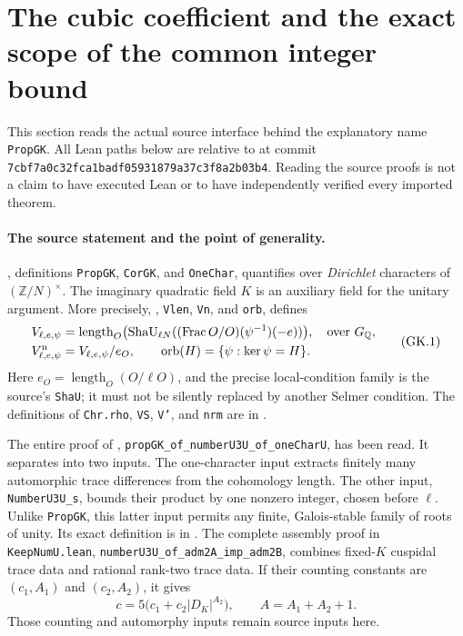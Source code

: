 \section{The cubic coefficient and the exact scope of the common integer bound}
\label{sec:cubic-propgk-size}

This section reads the actual source interface behind the explanatory
name \texttt{PropGK}.  All Lean paths below are relative to
at commit \texttt{7cbf7a0c32fca1badf05931879a37c3f8a2b03b4}.
Reading the source proofs is not a claim to have executed Lean or to
have independently verified every imported theorem.

\paragraph{The source statement and the point of generality.}
, definitions
\texttt{PropGK}, \texttt{CorGK}, and \texttt{OneChar}, quantifies
over \emph{Dirichlet} characters of $(\mathbb Z/N)^\times$.
The imaginary quadratic field $K$ is an auxiliary field for the
unitary argument.  More precisely,
,
\texttt{Vlen}, \texttt{Vn}, and \texttt{orb}, defines
\[
 \begin{split}
 V_{\ell,e,\psi}
   &=\operatorname{length}_{O}
       \bigl(\operatorname{ShaU}_{\ell N}
        ((\operatorname{Frac}O/O)(\psi^{-1})(-e))\bigr),
       \quad\hbox{over }G_{\mathbb Q},\\
 V^{\rm n}_{\ell,e,\psi}&=V_{\ell,e,\psi}/e_O,
 \qquad
 \operatorname{orb}(H)=\{\psi:\ker\psi=H\}.
 \end{split}                                                    \tag{GK.1}
\]
Here $e_O=\operatorname{length}_O(O/\ell O)$, and the precise
local-condition family is the source's \texttt{ShaU}; it must not
be silently replaced by another Selmer condition.  The definitions
of \texttt{Chr.rho}, \texttt{VS}, \texttt{V'}, and \texttt{nrm}
are in .

The entire proof of
,
\texttt{propGK\_of\_numberU3U\_of\_oneCharU}, has been read.
It separates into two inputs.  The one-character input extracts
finitely many automorphic trace differences from the cohomology
length.  The other input, \texttt{NumberU3U\_s}, bounds their product
by one nonzero integer, chosen before $\ell$.
Unlike \texttt{PropGK}, this latter input permits any finite,
Galois-stable family of roots of unity.  Its exact definition is in
.
The complete assembly proof in \texttt{KeepNumU.lean},
\texttt{numberU3U\_of\_adm2A\_imp\_adm2B}, combines fixed-$K$
cuspidal trace data and rational rank-two trace data.  If their
counting constants are $(c_1,A_1)$ and $(c_2,A_2)$, it gives
\[
 c=5\bigl(c_1+c_2|D_K|^{A_2}\bigr),\qquad A=A_1+A_2+1.
                                                               \tag{GK.2}
\]
Those counting and automorphy inputs remain source inputs here.

